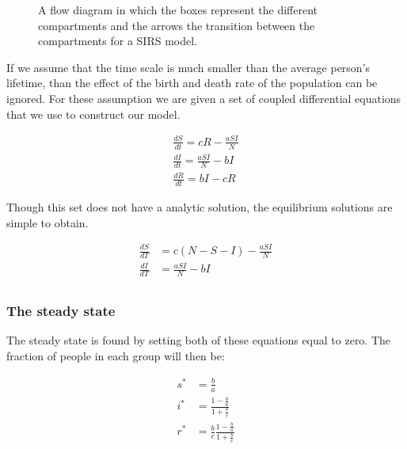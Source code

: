 \begin{figure}[h]
\center
{}
\caption{A flow diagram in which the boxes represent the different compartments and the arrows the transition between the compartments for a SIRS model.}
\label{fig:SIRS}
\end{figure}

If we assume that the time scale is much smaller than the average person's lifetime, than the effect of the birth and death rate of the population can be ignored. For these assumption we are given a set of coupled differential equations that we use to construct our model. 

\begin{align}
\frac{dS}{dt} = cR - \frac{aSI}{N}\\
\frac{dI}{dt} = \frac{aSI}{N} - bI\\
\frac{dR}{dt} = bI - cR
\end{align}


Though this set does not have a analytic solution, the equilibrium solutions are simple to obtain.

\begin{align}
\frac{dS}{dT} &= c(N-S-I) - \frac{aSI}{N} \\
\frac{dI}{dT} &= \frac{aSI}{N} - bI\\
\end{align}

\subsubsection{The steady state}\label{sec:stady_state}
The steady state is found by setting both of these equations equal to zero. The fraction of people in each group will then be:

\begin{align}
s^* &= \frac{b}{a} \\
i^* &= \frac{1- \frac{b}{a}}{ 1 + \frac{b}{c}} \\
r^* &= \frac{b}{c} \frac{1- \frac{b}{a}}{ 1 + \frac{b}{c}}
\end{align}

